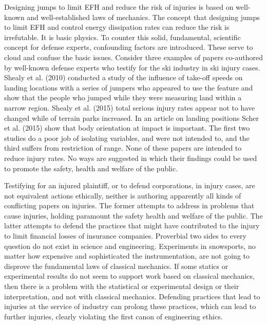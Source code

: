 \documentclass{article}
\begin{document}
Designing jumps to limit EFH and reduce the risk of injuries is based on
well-known and well-established laws of mechanics. The concept that designing
jumps to limit EFH and control energy dissipation rates can reduce the risk is
irrefutable. It is basic physics. To counter this solid, fundamental,
scientific concept for defense experts, confounding factors are introduced.
These serve to cloud and confuse the basic issues. Consider three examples of
papers co-authored by well-known defense experts who testify for the ski
industry in ski injury cases. Shealy et al. (2010) conducted a study of the
influence of take-off speeds on landing locations with a series of jumpers who
appeared to use the feature and show that the people who jumped while they were
measuring land within a narrow region. Shealy et al. (2015) total serious
injury rates appear not to have changed while of terrain parks increased. In an
article on landing positions Scher et al. (2015) show that body orientation at
impact is important. The first two studies do a poor job of isolating
variables, and were not intended to, and the third suffers from restriction of
range. None of these papers are intended to reduce injury rates. No ways are
suggested in which their findings could be used to promote the safety, health
and welfare of the public.

Testifying for an injured plaintiff, or to defend corporations, in injury
cases, are not equivalent actions ethically, neither is authoring apparently
all kinds of conflicting papers on injuries. The former attempts to address in
problems that cause injuries, holding paramount the safety health and welfare
of the public. The latter attempts to defend the practices that might have
contributed to the injury to limit financial losses of insurance companies.
Proverbial two sides to every question do not exist in science and engineering.
Experiments in snowsports, no matter how expensive and sophisticated the
instrumentation, are not going to disprove the fundamental laws of classical
mechanics. If some statics or experimental results do not seem to support work
based on classical mechanics, then there is a problem with the statistical or
experimental design or their interpretation, and not with classical mechanics.
Defending practices that lead to injuries at the service of industry can
prolong these practices, which can lead to further injuries, clearly violating
the first canon of engineering ethics.
\end{document}
